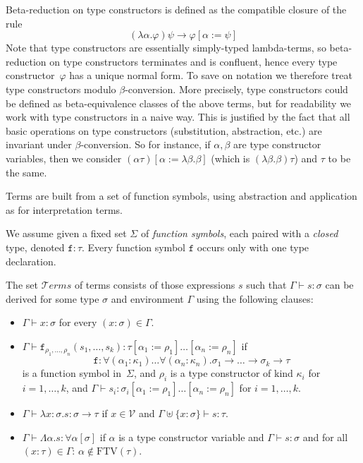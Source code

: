 \documentclass[runningheads,a4paper]{llncs}
\newcommand{\Vars}{\mathcal{V}}
\newcommand{\Terms}{\mathcal{T}\!\mathit{erms}}
\newcommand{\quant}[2]{\forall #1[#2]}
\newcommand{\arrtype}{\rightarrow}
\newcommand{\abs}[2]{\lambda #1.#2}
\newcommand{\tabs}[2]{\Lambda #1.#2}
\newcommand{\FTV}{\mathrm{FTV}}
\begin{document}
\begin{definition}
  Beta-reduction on type constructors is defined as the compatible
  closure of the rule
  \[
  (\lambda\alpha.\varphi)\psi \to \varphi[\alpha := \psi]
  \]
  Note that type constructors are essentially simply-typed
  lambda-terms, so beta-reduction on type constructors terminates and
  is confluent, hence every type constructor~$\varphi$ has a unique
  normal form. To save on notation we therefore treat type
  constructors modulo $\beta$-conversion. More precisely, type
  constructors could be defined as beta-equivalence classes of the
  above terms, but for readability we work with type constructors in a
  naive way. This is justified by the fact that all basic operations
  on type constructors (substitution, abstraction, etc.) are invariant
  under $\beta$-conversion. So for instance, if $\alpha,\beta$ are
  type constructor variables, then we consider $(\alpha \tau)[\alpha
    := \lambda \beta . \beta]$ (which is $(\lambda \beta . \beta)
  \tau$) and $\tau$ to be the same.
\end{definition}

Terms are built from a set of function symbols, using abstraction and
application as for interpretation terms.

\begin{definition}
We assume given a fixed set $\Sigma$ of \emph{function symbols}, each
paired with a \emph{closed} type, denoted $\mathtt{f} : \tau$.  Every
function symbol $\mathtt{f}$ occurs only with one type declaration.

The set $\Terms$ of terms consists of those expressions $s$ such that
$\Gamma \vdash s : \sigma$ can be derived for some type $\sigma$ and
environment $\Gamma$ using the following clauses:
\begin{itemize}
\item $\Gamma \vdash x : \sigma$ for every $(x : \sigma) \in \Gamma$.
\item $\Gamma \vdash \mathtt{f}_{\rho_1,\ldots,\rho_n}(s_1,\dots,s_k)
  : \tau[\alpha_1 := \rho_1]\ldots[\alpha_n := \rho_n]$ if
  \[
  \mathtt{f} : \forall (\alpha_1 : \kappa_1) \ldots
  \forall (\alpha_n : \kappa_n) . \sigma_1 \arrtype \ldots \arrtype
  \sigma_k \arrtype \tau
  \]
  is a function symbol in~$\Sigma$, and $\rho_i$ is a type constructor
  of kind $\kappa_i$ for $i=1,\ldots,k$, and $\Gamma \vdash s_i :
  \sigma_i[\alpha_1 := \rho_1]\ldots[\alpha_n := \rho_n]$ for
  $i=1,\ldots,k$.
\item $\Gamma \vdash \abs{x:\sigma}{s} : \sigma \arrtype \tau$ if $x
  \in \Vars$ and $\Gamma \uplus \{ x : \sigma \} \vdash s : \tau$.
\item $\Gamma \vdash \tabs{\alpha}{s} : \quant{\alpha}{\sigma}$ if
  $\alpha$ is a type constructor variable and $\Gamma \vdash s :
  \sigma$ and for all $(x : \tau) \in \Gamma$: $\alpha \notin
  \FTV(\tau)$.
\end{itemize}
\end{definition}
\end{document}
